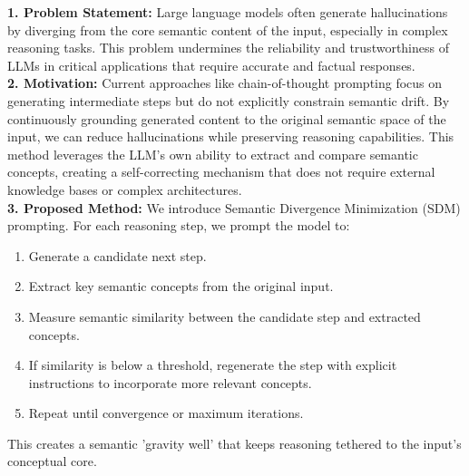 \begin{tcolorbox}[colback=blue!5!white,colframe=blue!75!black,title=\textbf{Semantic Divergence Minimization: Reducing Hallucinations in Large Language Models through Iterative Concept Grounding (Part 1)}]
\small{
\textbf{1. Problem Statement:} Large language models often generate hallucinations by diverging from the core semantic content of the input, especially in complex reasoning tasks. This problem undermines the reliability and trustworthiness of LLMs in critical applications that require accurate and factual responses.
\\

\textbf{2. Motivation:} Current approaches like chain-of-thought prompting focus on generating intermediate steps but do not explicitly constrain semantic drift. By continuously grounding generated content to the original semantic space of the input, we can reduce hallucinations while preserving reasoning capabilities. This method leverages the LLM's own ability to extract and compare semantic concepts, creating a self-correcting mechanism that does not require external knowledge bases or complex architectures.
\\

\textbf{3. Proposed Method:} We introduce Semantic Divergence Minimization (SDM) prompting. For each reasoning step, we prompt the model to:
\begin{enumerate}
    \item Generate a candidate next step.
    \item Extract key semantic concepts from the original input.
    \item Measure semantic similarity between the candidate step and extracted concepts.
    \item If similarity is below a threshold, regenerate the step with explicit instructions to incorporate more relevant concepts.
    \item Repeat until convergence or maximum iterations.
\end{enumerate}

This creates a semantic 'gravity well' that keeps reasoning tethered to the input's conceptual core.
}
\end{tcolorbox}

\newpage

